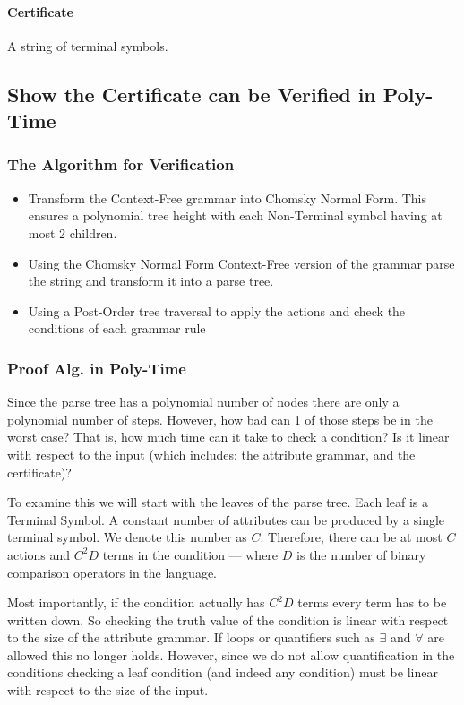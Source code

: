 \paragraph{Certificate}

A string of terminal symbols.

\subsection{Show the Certificate can be Verified in Poly-Time}

\subsubsection{The Algorithm for Verification}

\begin{itemize}
\item
  Transform the Context-Free grammar into Chomsky Normal Form. This
  ensures a polynomial tree height with each Non-Terminal symbol having
  at most 2 children.
\item
  Using the Chomsky Normal Form Context-Free version of the grammar
  parse the string and transform it into a parse tree.
\item
  Using a Post-Order tree traversal to apply the actions and check the
  conditions of each grammar rule
\end{itemize}
\subsubsection{Proof Alg. in Poly-Time}

Since the parse tree has a polynomial number of nodes there are only a
polynomial number of steps. However, how bad can 1 of those steps be in
the worst case? That is, how much time can it take to check a condition?
Is it linear with respect to the input (which includes: the attribute
grammar, and the certificate)?

To examine this we will start with the leaves of the parse tree. Each
leaf is a Terminal Symbol. A constant number of attributes can be
produced by a single terminal symbol. We denote this number as $C$.
Therefore, there can be at most $C$ actions and $C^2 D$ terms in the
condition --- where $D$ is the number of binary comparison operators in
the language.

Most importantly, if the condition actually has $C^2 D$ terms every term
has to be written down. So checking the truth value of the condition is
linear with respect to the size of the attribute grammar. If loops or
quantifiers such as $\exists$ and $\forall$ are allowed this no longer
holds. However, since we do not allow quantification in the conditions
checking a leaf condition (and indeed any condition) must be linear with
respect to the size of the input.


